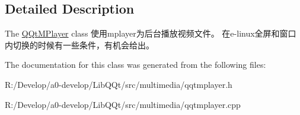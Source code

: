 \subsection{Detailed Description}
The \mbox{\hyperlink{class_q_qt_m_player}{Q\+Qt\+M\+Player}} class 使用mplayer为后台播放视频文件。 在e-\/linux全屏和窗口内切换的时候有一些条件，有机会给出。 

The documentation for this class was generated from the following files\+:\begin{DoxyCompactItemize}
\item 
R\+:/\+Develop/a0-\/develop/\+Lib\+Q\+Qt/src/multimedia/qqtmplayer.\+h\item 
R\+:/\+Develop/a0-\/develop/\+Lib\+Q\+Qt/src/multimedia/qqtmplayer.\+cpp\end{DoxyCompactItemize}

